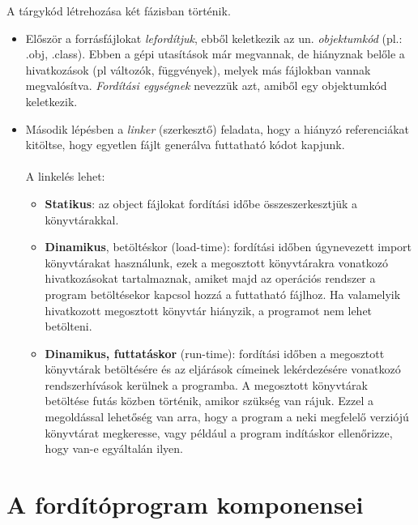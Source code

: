 \documentclass[12pt,margin=0px]{article}
\begin{document}
    \noindent A tárgykód létrehozása két fázisban történik.
    \begin{itemize}
        \item Először a forrásfájlokat \textit{lefordítjuk}, ebből keletkezik az un. \textit{objektumkód} (pl.: .obj, .class). Ebben a gépi utasítások már megvannak, de hiányznak belőle a hivatkozások (pl változók, függvények), melyek más fájlokban vannak megvalósítva.
        \textit{Fordítási egységnek} nevezzük azt, amiből egy objektumkód keletkezik.
	
        \item Második lépésben a \textit{linker} (szerkesztő) feladata, hogy a hiányzó referenciákat kitöltse, hogy egyetlen fájlt generálva futtatható kódot kapjunk.\\\\
        \noindent A linkelés lehet:
        \begin{itemize}
            \item \textbf{Statikus}: az object fájlokat fordítási időbe összeszerkesztjük a könyvtárakkal.
            \item \textbf{Dinamikus}, betöltéskor (load-time): fordítási időben úgynevezett import könyvtárakat használunk, ezek a megosztott könyvtárakra vonatkozó hivatkozásokat tartalmaznak, amiket majd az operációs rendszer a program betöltésekor kapcsol hozzá a futtatható fájlhoz. Ha valamelyik hivatkozott megosztott könyvtár hiányzik, a programot nem lehet betölteni.
            \item \textbf{Dinamikus, futtatáskor} (run-time): fordítási időben a megosztott könyvtárak betöltésére és az eljárások címeinek lekérdezésére vonatkozó rendszerhívások kerülnek a programba. A megosztott könyvtárak betöltése futás közben történik, amikor szükség van rájuk. Ezzel a megoldással lehetőség van arra, hogy a program a neki megfelelő verziójú könyvtárat megkeresse, vagy például a program indításkor ellenőrizze, hogy van-e egyáltalán ilyen.        \end{itemize}
    \end{itemize}	

    \section*{A fordítóprogram komponensei}	
\end{document}
